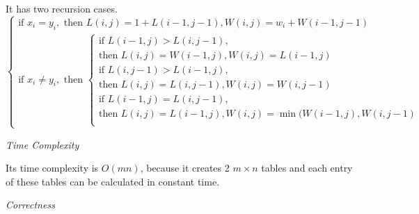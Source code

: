 \documentclass[12pt,letterpaper]{article}
\begin{document}
It has two recursion cases.
\[
	\begin{cases}
		\text{if } x_i=y_i, \text{ then } L(i,j)=1+L(i-1, j-1), W(i,j)=w_i+W(i-1, j-1)\\
		\text{if } x_i\neq y_i, \text{ then } 
		\begin{cases}
			\text{if } L(i-1,j) > L(i,j-1),\\
			\text{then } L(i,j)=W(i-1,j), W(i,j)=L(i-1,j)\\
			\text{if } L(i,j-1) > L(i-1,j),\\
			\text{then } L(i,j)=L(i,j-1), W(i,j)=W(i,j-1)\\
			\text{if } L(i-1,j) = L(i,j-1),\\
			\text{then } L(i,j)=L(i-1,j), W(i,j)=\min(W(i-1,j), W(i,j-1)\\
		\end{cases}
	\end{cases}
\]\par
\medskip\noindent\textit{Time Complexity}\par
Its time complexity is $O(mn)$, because it creates 2 $m\times n$ tables and each entry of these tables can be calculated in constant time.\par
\medskip\noindent\textit{Correctness}\par
\end{document}
